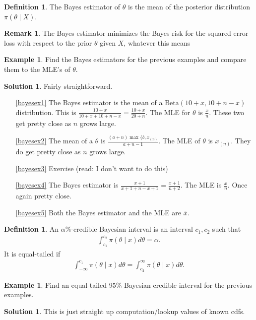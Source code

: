 \documentclass[11pt]{amsart}
\theoremstyle{definition}
\newtheorem{definition}[theorem]{Definition}
\newtheorem{remark}[theorem]{Remark}
\newtheorem{example}[theorem]{Example}
\newtheorem{solution}[theorem]{Solution}
\numberwithin{equation}{section}
\begin{document}
\begin{definition}
    The Bayes estimator of $\theta$ is the mean of the posterior distribution $\pi(\theta\mid X)$.
\end{definition}
\begin{remark}
    The Bayes estimator minimizes the Bayes risk for the squared error loss with respect to the prior $\theta$ given $X$, whatever this means
\end{remark}
\begin{example}
    Find the Bayes estimators for the previous examples and compare them to the MLE's of $\theta$.
\end{example}
\addtocounter{theorem}{-1}
\begin{solution}
    Fairly straightforward.
    \begin{enumerate}
        \item [\ref{bayesex1}] The Bayes estimator is the mean of a $\mathrm{Beta}(10+x,10+n-x)$ distribution. This is $\frac{10+x}{10+x+10+n-x}=\frac{10+x}{20+n}$. The MLE for $\theta$ is $\frac{x}{n}$. These two get pretty close as $n$ grows large.
        \item [\ref{bayesex2}] The mean of a $\theta$ is $\frac{(a+n)\max\{b,x_{(n)}}{a+n-1}$. The MLE of $\theta$ is $x_{(n)}$. They do get pretty close as $n$ grows large.
        \item [\ref{bayesex3}] Exercise (read: I don't want to do this)
        \item [\ref{bayesex4}] The Bayes estimator is $\frac{x+1}{x+1+n-x+1}=\frac{x+1}{n+2}$. The MLE is $\frac{x}{n}$. Once again pretty close.
        \item [\ref{bayesex5}] Both the Bayes estimator and the MLE are $\bar x$.
    \end{enumerate}
\end{solution}
\begin{definition}
    An $\alpha\%$-credible Bayesian interval is an interval $c_1,c_2$ such that 
    \begin{align*}
        \int_{c_1}^{c_2}\pi(\theta\mid x)d\theta=\alpha.
    \end{align*}
    It is equal-tailed if
    \begin{align*}
        \int_{-\infty}^{c_1}\pi(\theta\mid x)d\theta=\int_{c_2}^\infty\pi(\theta\mid x)d\theta.
    \end{align*}
\end{definition}
\begin{example}
    Find an equal-tailed 95\% Bayesian credible interval for the previous examples.
\end{example}
\addtocounter{theorem}{-1}
\begin{solution}
    This is just straight up computation/lookup values of known cdfs.
\end{solution}
\end{document}
